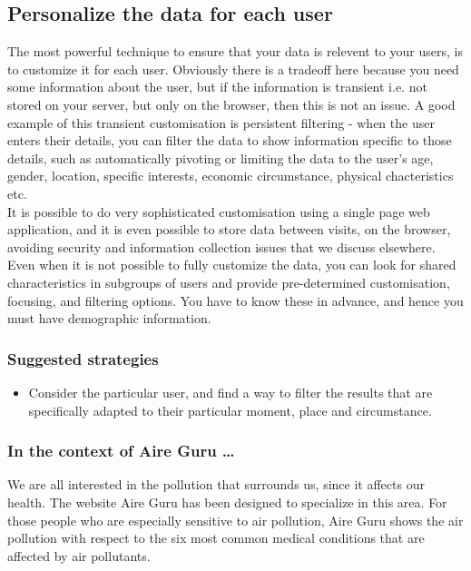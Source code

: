 \subsection{Personalize the data for each user}

The most powerful technique to ensure that your data is relevent to your users, is to customize it 
for each user. Obviously there is a tradeoff here because you need some information about the user,
but if the information is transient i.e. not stored on your server, but only on the browser, then this
is not an issue. A good example of this transient customisation is persistent filtering - when the user enters
their details, you can filter the data to show information specific to those details,
such as automatically pivoting or limiting the data to the user's age, gender, location, specific interests, economic circumstance, physical chacteristics etc.\\

It is possible to do very sophisticated customisation using a single page web application, and it is
even possible to store data between visits, on the browser, avoiding security and information collection issues that
we discuss elsewhere. \\

Even when it is not possible to fully customize the data, you can look for shared characteristics in subgroups of
users and provide pre-determined customisation, focusing, and filtering options.
You have to know these in advance, and hence you must have demographic information. \\

\subsubsection*{Suggested strategies} 

\begin{itemize}
  \item Consider the particular user, and find a way to filter the results that are specifically adapted to their particular moment, place and circumstance.
\end{itemize}

\subsubsection*{In the context of Aire Guru \ldots}

We are all interested in the pollution that surrounds us, since it affects our health. The website
Aire Guru has been designed to specialize in this area. For those people who are especially sensitive to air pollution,
Aire Guru shows the air pollution with respect to the six most common medical conditions that
are affected by air pollutants.\\
 
